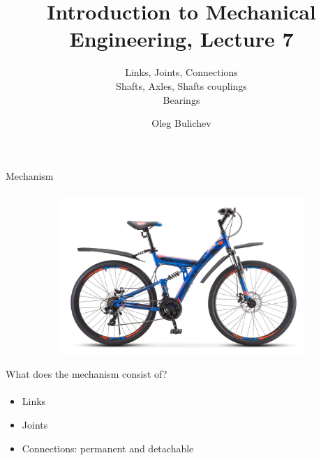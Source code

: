 \documentclass[aspectratio=169]{beamer}
\title[IME]{Introduction to Mechanical Engineering, Lecture 7} %
\subtitle{Links, Joints, Connections
\\ Shafts, Axles, Shafts couplings \\   
Bearings} %
\author{Oleg Bulichev}
\newcommand{\fbckg}[1]{\usebackgroundtemplate{\texttt{[image: \#1]}}}%
\begin{document}
\setlength{\abovedisplayskip}{0pt}
\setlength{\belowdisplayskip}{0pt}
\setlength{\abovedisplayshortskip}{0pt}
\setlength{\belowdisplayshortskip}{0pt}

\fbckg{fibeamer/figs/title_page.png}

\fbckg{fibeamer/figs/common.png}

\note{\scriptsize \begin{itemize}
        \item \ 
    \end{itemize}}

\begin{frame}[t]{Mechanism}
\framesubtitle{}
    \vspace{-0.6cm}
    \begin{figure}[H]
        \centering\includegraphics[height=6cm,width=1\textwidth,keepaspectratio]{bike.jpg}
        \label{fig:bike.jpg}
    \end{figure}
\end{frame}

\begin{frame}[t]{What does the mechanism consist of?}
\framesubtitle{}
    \begin{itemize}
        \item Links
        \item Joints
        \item Connections: permanent and detachable
    \end{itemize}
\end{frame}
\end{document}
